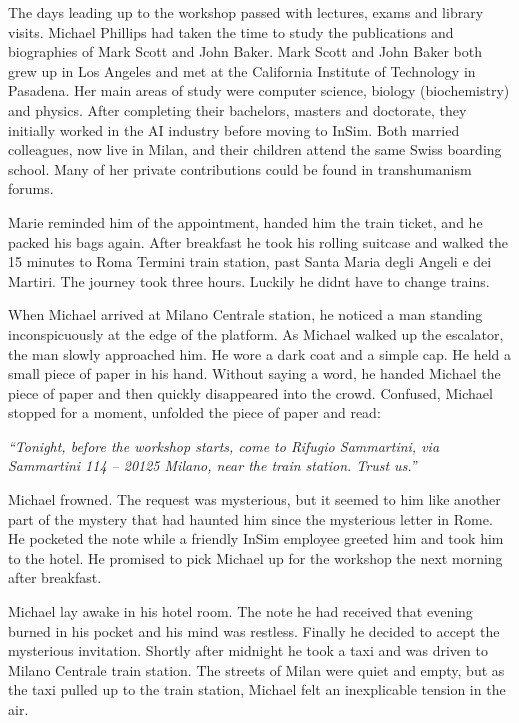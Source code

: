 \documentclass[
]{article}
\begin{document}
The days leading up to the workshop passed with lectures, exams and
library visits. Michael Phillips had taken the time to study the
publications and biographies of Mark Scott and John Baker. Mark Scott
and John Baker both grew up in Los Angeles and met at the California
Institute of Technology in Pasadena. Her main areas of study were
computer science, biology (biochemistry) and physics. After completing
their bachelor\textquotesingle s, master\textquotesingle s and
doctorate, they initially worked in the AI
\hspace{0pt}\hspace{0pt}industry before moving to InSim. Both married
colleagues, now live in Milan, and their children attend the same Swiss
boarding school. Many of her private contributions could be found in
transhumanism forums.

Marie reminded him of the appointment, handed him the train ticket, and
he packed his bags again. After breakfast he took his rolling suitcase
and walked the 15 minutes to Roma Termini train station, past Santa
Maria degli Angeli e dei Martiri. The journey took three hours. Luckily
he didn\textquotesingle t have to change trains.

When Michael arrived at Milano Centrale station, he noticed a man
standing inconspicuously at the edge of the platform. As Michael walked
up the escalator, the man slowly approached him. He wore a dark coat and
a simple cap. He held a small piece of paper in his hand. Without saying
a word, he handed Michael the piece of paper and then quickly
disappeared into the crowd. Confused, Michael stopped for a moment,
unfolded the piece of paper and read:

\emph{``Tonight, before the workshop starts, come to Rifugio Sammartini,
via Sammartini 114 -- 20125 Milano, near the train station. Trust us.''}

Michael frowned. The request was mysterious, but it seemed to him like
another part of the mystery that had haunted him since the mysterious
letter in Rome. He pocketed the note while a friendly InSim employee
greeted him and took him to the hotel. He promised to pick Michael up
for the workshop the next morning after breakfast.

Michael lay awake in his hotel room. The note he had received that
evening burned in his pocket and his mind was restless. Finally he
decided to accept the mysterious invitation. Shortly after midnight he
took a taxi and was driven to Milano Centrale train station. The streets
of Milan were quiet and empty, but as the taxi pulled up to the train
station, Michael felt an inexplicable tension in the air.
\end{document}
